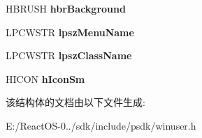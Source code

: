 \begin{DoxyCompactItemize}
\item 
\mbox{\label{struct___w_n_d_c_l_a_s_s_e_x_w_a660c278fd5ab2a2a25d43051ae97f41a}} 
H\+B\+R\+U\+SH {\bfseries hbr\+Background}
\item 
\mbox{\label{struct___w_n_d_c_l_a_s_s_e_x_w_a3fce801fc12f0b6b20261f75c27ea722}} 
L\+P\+C\+W\+S\+TR {\bfseries lpsz\+Menu\+Name}
\item 
\mbox{\label{struct___w_n_d_c_l_a_s_s_e_x_w_a253422317c9954cb0e307661200791d8}} 
L\+P\+C\+W\+S\+TR {\bfseries lpsz\+Class\+Name}
\item 
\mbox{\label{struct___w_n_d_c_l_a_s_s_e_x_w_a8d4c2e80c61dfdbbb8bf934921808d83}} 
H\+I\+C\+ON {\bfseries h\+Icon\+Sm}
\end{DoxyCompactItemize}


该结构体的文档由以下文件生成\+:\begin{DoxyCompactItemize}
\item 
E\+:/\+React\+O\+S-\/0../sdk/include/psdk/winuser.\+h\end{DoxyCompactItemize}
